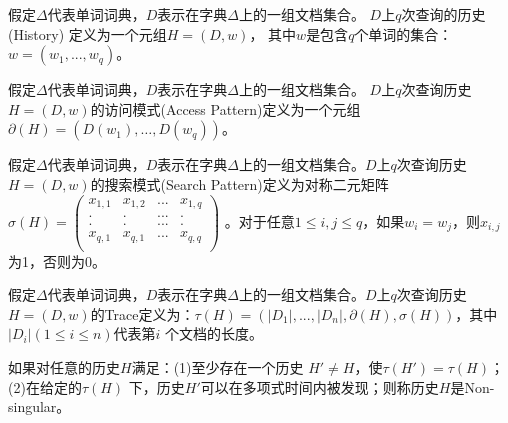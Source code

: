 \begin{defn}[History]
\label{defn:attack_history}

假定$\Delta$代表单词词典，$D$表示在字典$\Delta$上的一组文档集合。
$D$上$q$次查询的历史(History) 定义为一个元组$H = (D,w)$，
其中$w$是包含$q$个单词的集合：$w = (w_1,...,w_q)$。

\end{defn}


\begin{defn}
\label{defn:attack_access_pattern}
假定$\Delta$代表单词词典，$D$表示在字典$\Delta$上的一组文档集合。
$D$上$q$次查询历史$H = (D,w)$的访问模式(Access Pattern)定义为一个元组 $ \partial (H)=(D(w_1 ),…,D(w_q))$。
\end{defn}



\begin{defn}
\label{defn:attack_search_pattern}
假定$\Delta$代表单词词典，$D$表示在字典$\Delta$上的一组文档集合。$D$上$q$次查询历史 $H=(D,w)$的搜索模式(Search Pattern)定义为对称二元矩阵$ \sigma(H) = \left(
  \begin{array}{cccc}
     x_{1,1} & x_{1,2} & ... & x_{1,q}  \\
    . & . & ... & . \\
    . & . & ... & . \\
     x_{q,1} & x_{q,1} & ... & x_{q,q}  \\
  \end{array}
\right)$ 。对于任意$1 \leq i,j \leq q$，如果$w_i = w_j$，则$x_{i,j}$为1，否则为0。
\end{defn}

\begin{defn}[Trace]
\label{defn:attack_trace}
假定$\Delta$代表单词词典，$D$表示在字典$\Delta$上的一组文档集合。$D$上$q$次查询历史 $H = (D,w)$的Trace定义为：$τ(H)=(|D_1 |,...,|D_n |,\partial(H),\sigma(H))$，其中$|D_i |(1 \leq i \leq n)$代表第$i$ 个文档的长度。
\end{defn}


\begin{defn}
\label{defn:attack_non_singular_history}
如果对任意的历史$H$满足：(1)至少存在一个历史 $H' \neq H$，使$\tau(H') = \tau(H)$；(2)在给定的$\tau(H)$ 下，历史$H'$可以在多项式时间内被发现；则称历史$H$是Non-singular。
\end{defn}



